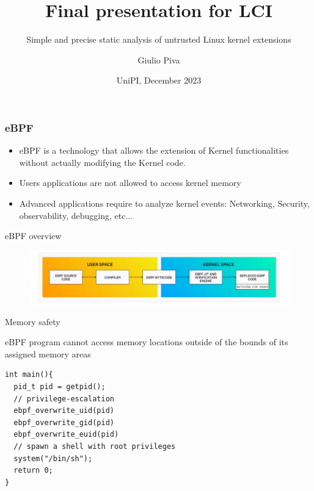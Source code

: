 \documentclass[aspectratio=169]{beamer}
\title[Final presentation for CS4280] %
{Final presentation for LCI}
\subtitle{Simple and precise static analysis of untrusted Linux kernel extensions}
\author[]
{Giulio Piva}
\date[VLC 2021] %
{UniPI, December 2023}
\begin{document}
\frame{\titlepage}
\begin{frame}
\frametitle{eBPF}

\begin{figure}
    \centering

\end{figure}

\begin{itemize}
\item eBPF is a technology that allows the extension of Kernel functionalities
without actually modifying the Kernel code.
\item Users applications are not allowed to access kernel memory
\item Advanced applications require to analyze kernel events:
  Networking, Security, observability, debugging, etc...
\end{itemize}
\begin{figure}
    \centering
\end{figure}
\end{frame}


\begin{frame}{eBPF overview}
  \begin{figure}
    \centering
    \includegraphics[width=\textwidth]{images/ebpf-overview.png}
  \end{figure}
\end{frame}

\begin{frame}[fragile]{Memory safety}

   eBPF program cannot access memory locations outside of the bounds of its assigned memory areas
\begin{lstlisting}[frame=single]
int main(){
  pid_t pid = getpid();
  // privilege-escalation
  ebpf_overwrite_uid(pid)
  ebpf_overwrite_gid(pid)
  ebpf_overwrite_euid(pid)
  // spawn a shell with root privileges
  system("/bin/sh");
  return 0;
}
\end{lstlisting}
\end{frame}
\end{document}
